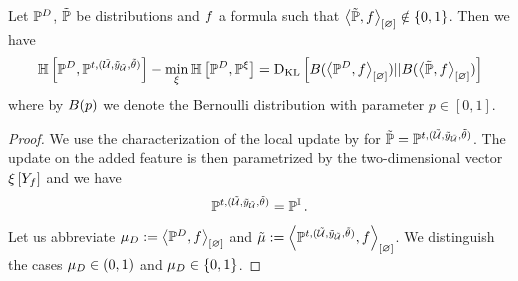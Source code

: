 \begin{lemma}
    Let $\mathbb{P}^{D}$, $\tilde{\mathbb{P}}$ be distributions and $f$ a formula such that $\left\langle \tilde{\mathbb{P}},f\right\rangle_{\left[ \varnothing \right]}\notin\{0,1\}$.
    Then we have
    \begin{align*}
        \mathbb{H}\left[\mathbb{P}^{D},\mathbb{P}^{t,(\tilde{\mathcal{U}},\tilde{y}_{\tilde{\mathcal{U}}},\tilde{\theta})}\right]
        - \min_{\xi} \mathbb{H}\left[\mathbb{P}^{D},\mathbb{P}^{\xi}\right]
        = \mathrm{D}_{\mathrm{KL}}\left[ B(\left\langle \mathbb{P}^{D},f\right\rangle_{\left[ \varnothing \right]}) || B(\left\langle \tilde{\mathbb{P}},f\right\rangle_{\left[ \varnothing \right]}) \right]
    \end{align*}
    where by $B(p)$ we denote the Bernoulli distribution with parameter $p\in[0,1]$.
\end{lemma}
\begin{proof}
    We use the characterization of the local update by  for $\tilde{\mathbb{P}}=\mathbb{P}^{t,(\tilde{\mathcal{U}},\tilde{y}_{\tilde{\mathcal{U}}},\tilde{\theta})}$.
    The update on the added feature is then parametrized by the two-dimensional vector $\xi\left[Y_{f}\right]$ and we have
    \begin{align*}
        \mathbb{P}^{t,(\tilde{\mathcal{U}},\tilde{y}_{\tilde{\mathcal{U}}},\tilde{\theta})} = \mathbb{P}^{\mathbb{I}} \, .
    \end{align*}
    Let us abbreviate $\mu_{D}:=\left\langle \mathbb{P}^{D},f\right\rangle_{\left[ \varnothing \right]}$ and $\tilde{\mu}:=\left\langle \mathbb{P}^{t,(\tilde{\mathcal{U}},\tilde{y}_{\tilde{\mathcal{U}}},\tilde{\theta})},f\right\rangle_{\left[ \varnothing \right]}$.
    We distinguish the cases $\mu_{D}\in(0,1)$ and $\mu_{D}\in\{0,1\}$.


\end{proof}
